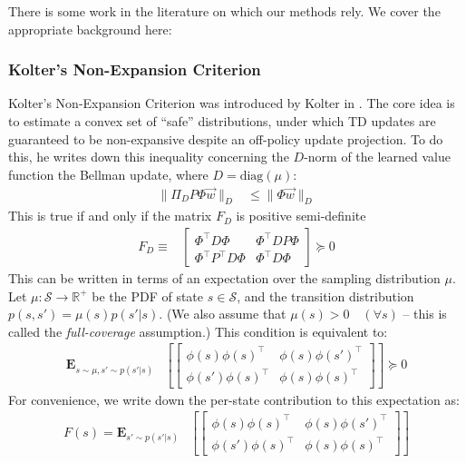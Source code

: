 \documentclass[11pt]{article}
\newcommand{\E}{\textbf{E}}
\begin{document}
There is some work in the literature on which our methods rely. We cover the appropriate background here:

\subsubsection{Kolter's Non-Expansion Criterion }

Kolter's Non-Expansion Criterion was introduced by Kolter in \citeyear{kolter2011fixed}. The core idea is to estimate a convex set of ``safe'' distributions, under which TD updates are guaranteed to be non-expansive despite an off-policy update projection. To do this, he writes down this inequality concerning the $D$-norm of the learned value function the Bellman update, where $D=\text{diag}(\mu)$:
\begin{align}
    \|\Pi_D P\Phi \vec w\|_D & \leq \|\Phi \vec w\|_D
\end{align}
This is true if and only if the matrix $F_D$ is positive semi-definite
\begin{align}
    F_D \equiv & \begin{bmatrix}
        \Phi^\top D \Phi & \Phi^\top D P \Phi \\
        \Phi^\top P^\top D \Phi & \Phi^\top D \Phi
    \end{bmatrix} \succcurlyeq 0 \label{eqn:koltercondmat}
\end{align}
This can be written in terms of an expectation over the sampling distribution $\mu$. Let $\mu : \mathcal S \to \mathbb R^+$ be the PDF of state $s \in \mathcal S$, and the transition distribution $p(s,s') = \mu(s) p(s'|s)$. (We also assume that $\mu(s) > 0 \quad (\forall s)$ -- this is called the \emph{full-coverage} assumption.) This condition is equivalent to:
\begin{align}
  \E_{s\sim \mu, s'\sim p(s'|s)} & \left[\begin{bmatrix}
        \phi(s)\phi(s)^\top & \phi(s)\phi(s')^\top \\
        \phi(s')\phi(s)^\top & \phi(s)\phi(s)^\top
    \end{bmatrix}\right] \succcurlyeq 0 \label{eqn:koldercondstate}
\end{align}
For convenience, we write down the per-state contribution to this expectation as:
\begin{align}
F(s) = \E_{s'\sim p(s'|s)} & \left[\begin{bmatrix}
    \phi(s)\phi(s)^\top & \phi(s)\phi(s')^\top \\
    \phi(s')\phi(s)^\top & \phi(s)\phi(s)^\top
\end{bmatrix}\right]
\end{align}
\end{document}
